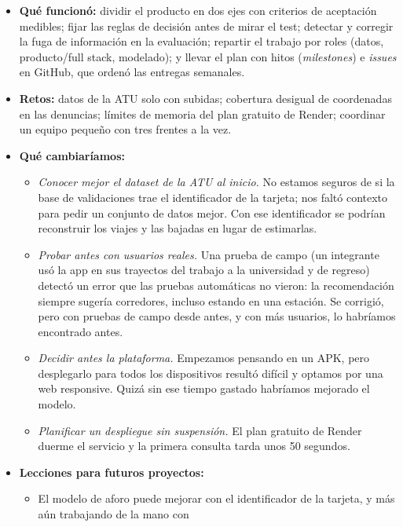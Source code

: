 \documentclass[11pt]{article}
\begin{document}
\begin{itemize}
  \item \textbf{Qué funcionó:} dividir el producto en dos ejes con criterios de aceptación medibles; fijar las
        reglas de decisión antes de mirar el test; detectar y corregir la fuga de información en la evaluación;
        repartir el trabajo por roles (datos, producto/full stack, modelado); y llevar el plan con hitos (\emph{milestones}) e \emph{issues} en GitHub, que ordenó las entregas semanales.
  \item \textbf{Retos:} datos de la ATU solo con subidas; cobertura desigual de coordenadas en las denuncias;
        límites de memoria del plan gratuito de Render; coordinar un equipo pequeño con tres frentes a la vez.
  \item \textbf{Qué cambiaríamos:}
    \begin{itemize}
      \item \emph{Conocer mejor el dataset de la ATU al inicio.} No estamos seguros de si la base de validaciones
            trae el identificador de la tarjeta; nos faltó contexto para pedir un conjunto de datos mejor. Con ese
            identificador se podrían reconstruir los viajes y las bajadas en lugar de estimarlas.
      \item \emph{Probar antes con usuarios reales.} Una prueba de campo (un integrante usó la app en sus trayectos del
            trabajo a la universidad y de regreso) detectó un error que las pruebas automáticas no vieron: la
            recomendación siempre sugería corredores, incluso estando en una estación. Se corrigió, pero con pruebas de
            campo desde antes, y con más usuarios, lo habríamos encontrado antes.
      \item \emph{Decidir antes la plataforma.} Empezamos pensando en un APK, pero desplegarlo para todos los
            dispositivos resultó difícil y optamos por una web responsive. Quizá sin ese tiempo gastado habríamos
            mejorado el modelo.
      \item \emph{Planificar un despliegue sin suspensión.} El plan gratuito de Render duerme el servicio y la primera
            consulta tarda unos 50 segundos.
    \end{itemize}
  \item \textbf{Lecciones para futuros proyectos:}
    \begin{itemize}
      \item El modelo de aforo puede mejorar con el identificador de la tarjeta, y más aún trabajando de la mano con

\end{itemize}
\end{itemize}
\end{document}
